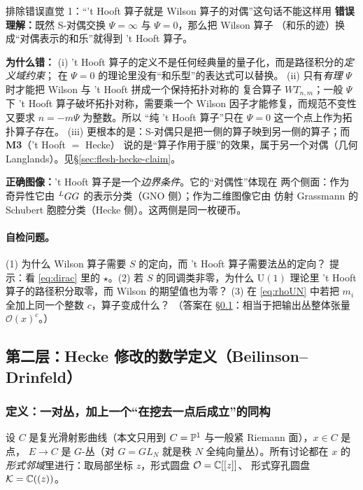 \begin{kcard}{排除错误直觉 1：“'t Hooft{} 算子就是 Wilson 算子的对偶”这句话不能这样用}
\textbf{错误理解：}既然 S-对偶交换 $\Psi=\infty$ 与 $\Psi=0$，那么把 Wilson 算子
（和乐的迹）换成“对偶表示的和乐”就得到 't Hooft{} 算子。

\textbf{为什么错：}
(i) 't Hooft{} 算子的定义不是任何经典量的量子化，而是路径积分的\emph{定义域约束}；
在 $\Psi=0$ 的理论里没有“和乐型”的表达式可以替换。\pA{}
(ii) 只有\emph{有理} $\Psi$ 时才能把 Wilson 与 't Hooft{} 拼成一个保持拓扑对称的
复合算子 $WT_{n,m}$；一般 $\Psi$ 下 't Hooft{} 算子破坏拓扑对称，需要乘一个
Wilson 因子才能修复，而规范不变性又要求 $n=-m\Psi$ 为整数。所以
“纯 't Hooft{} 算子”只在 $\Psi=0$ 这一个点上作为拓扑算子存在。\pA{}
(iii) 更根本的是：S-对偶只是把一侧的算子映到另一侧的算子；而 \textbf{M3}（'t Hooft $=$ Hecke）
说的是“算子作用于膜”的效果，属于另一个对偶（几何 Langlands）。见§\ref{sec:flesh-hecke-claim}。

\textbf{正确图像：}'t Hooft{} 算子是一个\emph{边界条件}。它的“对偶性”体现在
两个侧面：作为奇异性它由 ${}^{L}G G$ 的表示分类（GNO 侧）；作为二维图像它由
仿射 Grassmann 的 Schubert 胞腔分类（Hecke 侧）。这两侧是同一枚硬币。
\end{kcard}

\paragraph{自检问题。}
(1) 为什么 Wilson 算子需要 $S$ 的定向，而 't Hooft{} 算子需要法丛的定向？
提示：看 \eqref{eq:dirac} 里的 $\star$。(2) 若 $S$ 的同调类非零，为什么 $\mathrm{U}(1)$
理论里 't Hooft{} 算子的路径积分取零，而 Wilson 的期望值也为零？
(3) 在 \eqref{eq:rhoUN} 中若把 $m_i$ 全加上同一个整数 $c$，算子变成什么？
（答案在 §\ref{sec:flesh-hecke-hecke}：相当于把输出丛整体张量 $\mathcal{O}(x)^c$。）


\subsection{第二层：Hecke 修改的数学定义（Beilinson--Drinfeld）}
\label{sec:flesh-hecke-hecke}

\subsubsection{定义：一对丛，加上一个“在挖去一点后成立”的同构}

设 $C$ 是复光滑射影曲线（本文只用到 $C=\mathbb{P}^1$ 与一般紧 Riemann 面），$x\in C$ 是点，
$E\to C$ 是 $G$-丛（对 $G=GL_N$ 就是秩 $N$ 全纯向量丛）。所有讨论都在 $x$ 的
\emph{形式邻域}里进行：取局部坐标 $z$，形式圆盘 $\mathcal{O}=\mathbb{C}[[z]]$、
形式穿孔圆盘 $\mathcal{K}=\mathbb{C}((z))$。

